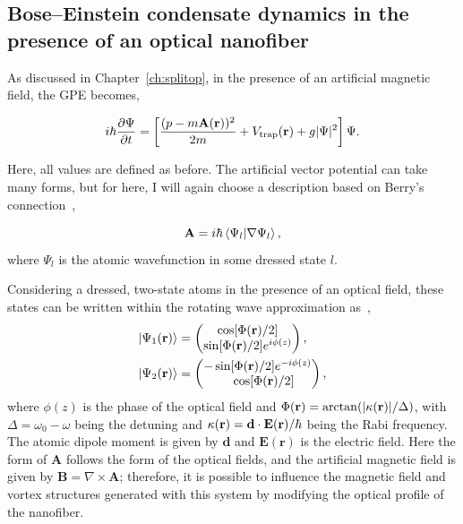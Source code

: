 \subsection{Bose--Einstein condensate dynamics in the presence of an optical nanofiber}

As discussed in Chapter~\ref{ch:splitop}, in the presence of an artificial magnetic field, the GPE becomes,

\begin{equation}
i\hbar \frac{\partial \Psi}{\partial t} = \left[\frac{(p-m\mathbf{A}({\bf r}))^2}{2m} + V_{\text{trap}}({\bf r}) + g|\Psi|^2 \right] \Psi.
\end{equation}

\noindent Here, all values are defined as before.
The artificial vector potential can take many forms, but for here, I will again choose a description based on Berry's connection~\cite{dalibard2011},

\begin{equation}
  \mathbf{A} = i\hbar \braket{\Psi_l | \nabla \Psi_l},
\end{equation}
\noindent where $\Psi_l$ is the atomic wavefunction in some dressed state $l$.

Considering a dressed, two-state atoms in the presence of an optical field, these states can be written within the rotating wave approximation as~\cite{mochol2015},
\begin{align}
\ket{\Psi_1({\bf r})} &= 
\begin{pmatrix}
    \cos[\Phi({\bf r})/2] \\
     \sin[\Phi({\bf r}) /2]e^{i\phi(z)} 
\end{pmatrix},\\
\ket{\Psi_2({\bf r})} &= 
\begin{pmatrix}
    -\sin[\Phi({\bf r}) /2]e^{-i\phi(z)} \\
    \quad\cos[\Phi({\bf r})/2]
\end{pmatrix},
\end{align}
\noindent where $\phi(z)$ is the phase of the optical field and $\Phi({\bf r}) = \arctan(|\kappa({\bf r})|/\Delta)$, with $\Delta = \omega_0 - \omega$ being the detuning and $\kappa({\bf r}) = \mathbf{d} \cdot \mathbf{E}({\bf r}) / \hbar$ being the Rabi frequency.
The atomic dipole moment is given by $\mathbf{d}$ and $\mathbf{E(\mathbf{r})}$ is the electric field.
Here the form of $\mathbf{A}$ follows the form of the optical fields, and the artificial magnetic field is given by $\mathbf{B}= \nabla \times \mathbf{A}$; therefore, it is possible to influence the magnetic field and vortex structures generated with this system by modifying the optical profile of the nanofiber.

